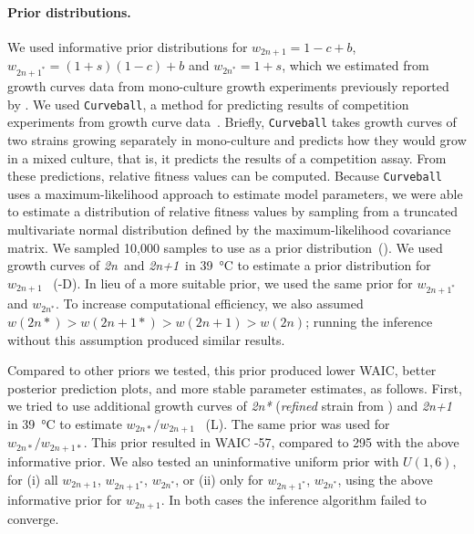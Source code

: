\documentclass[12pt]{extarticle}
\newcommand{\euwt}{\emph{2n}}
\newcommand{\anwt}{\emph{2n+1}}
\newcommand{\eumt}{\emph{2n*}}
\begin{document}
\paragraph{Prior distributions.} We used informative prior distributions for $w_{2n+1}=1-c+b$, $w_{2n+1^*}=(1+s)(1-c)+b$ and $w_{2n^*}=1+s$, which we estimated from growth curves data from mono-culture growth experiments previously reported by \citet[Figs. 3C, 4A, and S2]{Yona2012}.
We used \texttt{Curveball}, a method for predicting results of competition experiments from growth curve data~\citep[\href{https://curveball.yoavram.com}{curveball.yoavram.com}]{Ram2019}. Briefly, \texttt{Curveball} takes growth curves of two strains growing separately in mono-culture and predicts how they would grow in a mixed culture, that is, it predicts the results of a competition assay.
From these predictions, relative fitness values can be computed. Because \texttt{Curveball} uses a maximum-likelihood approach to estimate model parameters, we were able to estimate a distribution of relative fitness values by sampling from a truncated multivariate normal distribution defined by the maximum-likelihood covariance matrix. We sampled 10,000 samples to use as a prior distribution~().
We used growth curves of \euwt\ and \anwt\ in \SI{39}{\celsius} to estimate a prior distribution for $w_{2n+1}$ ~(-D). In lieu of a more suitable prior, we used the same prior for $w_{2n+1^*}$ and $w_{2n^*}$. 
To increase computational efficiency, we also assumed $w(2n*)>w(2n+1*)>w(2n+1)>w(2n)$; running the inference without this assumption produced similar results. 

Compared to other priors we tested, this prior produced lower WAIC, better posterior prediction plots, and more stable parameter estimates, as follows.
First, we tried to use additional growth curves of \eumt\; (\emph{refined} strain from \citet{Yona2012}) and \anwt\; in \SI{39}{\celsius} to estimate $w_{2n*}/w_{2n+1}$ ~(L). The same prior was used for $w_{2n*}/w_{2n+1*}$. This prior resulted in WAIC -57, compared to 295 with the above informative prior. %
We also tested an uninformative uniform prior with $\mathit{U}(1,6)$, for (i) all $w_{2n+1}$, $w_{2n+1^*}$, $w_{2n^*}$, or (ii) only for $w_{2n+1^*}$, $w_{2n^*}$, using the above informative prior for $w_{2n+1}$. In both cases the inference algorithm failed to converge.
 
\end{document}
